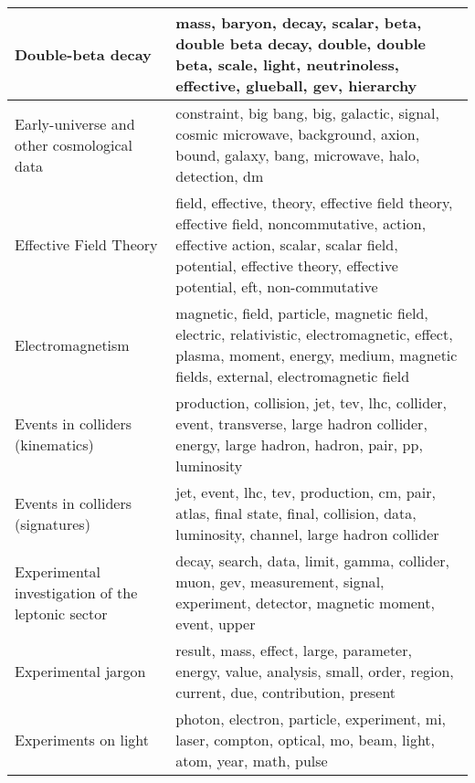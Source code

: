 \begin{longtable}[H]{p{}|p{}}
Double-beta decay                                   &                                                                 mass, baryon, decay, scalar, beta, double beta decay, double, double beta, scale, light, neutrinoless, effective, glueball, gev, hierarchy \\ \midrule
Early-universe and other cosmological data          &                                                                      constraint, big bang, big, galactic, signal, cosmic microwave, background, axion, bound, galaxy, bang, microwave, halo, detection, dm \\ \midrule
Effective Field Theory                              &  field, effective, theory, effective field theory, effective field, noncommutative, action, effective action, scalar, scalar field, potential, effective theory, effective potential, eft, non-commutative \\ \midrule
Electromagnetism                                    &                               magnetic, field, particle, magnetic field, electric, relativistic, electromagnetic, effect, plasma, moment, energy, medium, magnetic fields, external, electromagnetic field \\ \midrule
Events in colliders (kinematics)                    &                                                               production, collision, jet, tev, lhc, collider, event, transverse, large hadron collider, energy, large hadron, hadron, pair, pp, luminosity \\ \midrule
Events in colliders (signatures)                    &                                                                         jet, event, lhc, tev, production, cm, pair, atlas, final state, final, collision, data, luminosity, channel, large hadron collider \\ \midrule
Experimental investigation of the leptonic sector   &                                                                           decay, search, data, limit, gamma, collider, muon, gev, measurement, signal, experiment, detector, magnetic moment, event, upper \\ \midrule
Experimental jargon                                 &                                                                                 result, mass, effect, large, parameter, energy, value, analysis, small, order, region, current, due, contribution, present \\ \midrule
Experiments on light                                &                                                                                              photon, electron, particle, experiment, mi, laser, compton, optical, mo, beam, light, atom, year, math, pulse \\ \midrule

\end{longtable}
